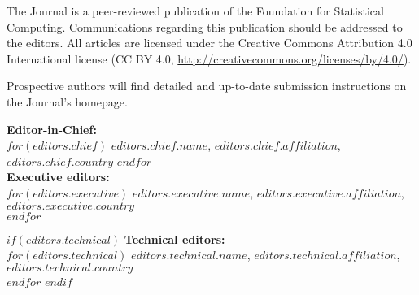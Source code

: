 \documentclass[a4paper,twoside]{report}
\begin{document}
\sectionhead{}

\titlepage

\vspace*{1in}
\begin{center}
\begin{minipage}{0.65\textwidth}
    \begin{center}
    The \R{} Journal is a peer-reviewed publication of
    the \R{} Foundation for Statistical Computing. Communications
    regarding this publication should be addressed to the editors. All
    articles are licensed under the Creative Commons Attribution 4.0
    International license (CC BY 4.0, \url{http://creativecommons.org/licenses/by/4.0/}).
    \bigskip

    Prospective authors will find detailed and up-to-date submission
    instructions on the Journal's homepage.


    \bigskip
      \textbf{Editor-in-Chief:}\\
      $for(editors.chief)$
        $editors.chief.name$, $editors.chief.affiliation$, $editors.chief.country$
      $endfor$\\

    \bigskip
      \textbf{Executive editors:}\\
      $for(editors.executive)$
        $editors.executive.name$, $editors.executive.affiliation$, $editors.executive.country$\\
      $endfor$

    $if(editors.technical)$
    \bigskip
      \textbf{Technical editors:}\\
      $for(editors.technical)$
        $editors.technical.name$, $editors.technical.affiliation$, $editors.technical.country$\\
      $endfor$
    $endif$





\end{center}
\end{minipage}
\end{center}
\end{document}
